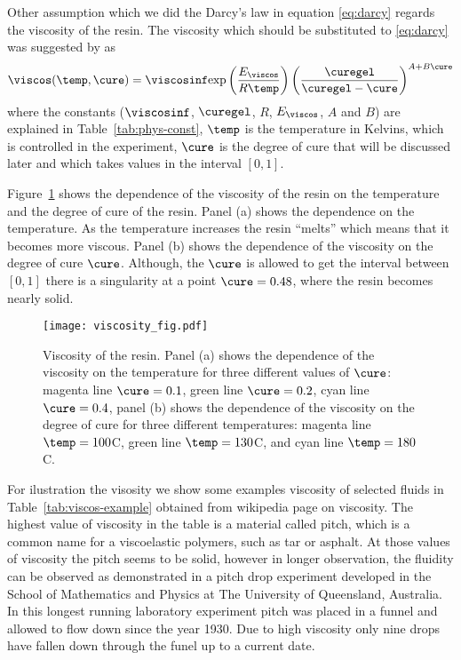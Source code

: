 \documentclass[twoside,a4paper,12pt]{article}
\newcommand{\figref}[1]{Figure~\ref{#1}}
\newcommand{\tabref}[1]{Table~\ref{#1}}
\newcommand{\note}[1]{{\color{red}(#1)}}
\newcommand{\note}[1]{}
\begin{document}
%
Other assumption which we did the Darcy's law in equation
\eqref{eq:darcy} regards the viscosity of the resin.  The viscosity
which should be substituted to \eqref{eq:darcy} was suggested by  \citet{Kenny1992}
as
%
\begin{align}
  \viscos(\temp,\cure) =
  \viscosinf \exp{\frac{E_\viscos }{R \temp}} \left(\frac{\curegel}{\curegel - \cure}\right)^{A+B\cure} \label{eq:viscosity}
\end{align}
%
where the constants ($\viscosinf$, $\curegel$, $R$, $E_\viscos$, $A$ and
$B$) are explained in \tabref{tab:phys-const}, %
$\temp$ is the temperature in Kelvins, which is controlled in the
experiment, $\cure$ is the degree of cure that will be discussed
later and which takes values in the interval $[0,1]$.

\figref{fig:viscos} shows the dependence of the viscosity of the resin
on the temperature and the degree of cure of the resin. Panel (a)
shows the dependence on the temperature. As the temperature increases
the resin ``melts'' which means that it becomes more viscous. Panel
(b) shows the dependence of the viscosity on the degree of cure
$\cure$. Although, the $\cure$ is allowed to get the interval between
$[0,1]$ there is a singularity at a point $\cure = 0.48$, where the
resin becomes nearly solid.

\begin{figure}
  \centering
  \texttt{[image: viscosity\_fig.pdf]}
  \caption{Viscosity of the resin. Panel (a) shows the dependence of the
    viscosity on the temperature for three different values of
    $\cure$: magenta line $\cure=0.1$, green line $\cure=0.2$, cyan
    line $\cure=0.4$, panel (b) shows the dependence of the viscosity
    on the degree of cure for three different temperatures: magenta
    line $\temp = 100$\degree C, green line $\temp = 130$\degree C, and cyan line
    $\temp = 180$\degree C.}
  \label{fig:viscos}
\end{figure}

For ilustration the visosity we show some examples viscosity of
selected fluids in \tabref{tab:viscos-example} obtained from wikipedia
page on viscosity. The highest value of viscosity in the table is a
material called pitch, which is a common name for a viscoelastic
polymers, such as tar or asphalt. At those values of viscosity the
pitch seems to be solid, however in longer observation, the fluidity
can be observed as demonstrated in a pitch drop experiment developed
in the School of Mathematics and Physics at The University of
Queensland, Australia. In this longest running laboratory experiment
pitch was placed in a funnel and allowed to flow down since the year
1930. Due to high viscosity only nine drops have fallen down through
the funel up to a current date.
\end{document}
